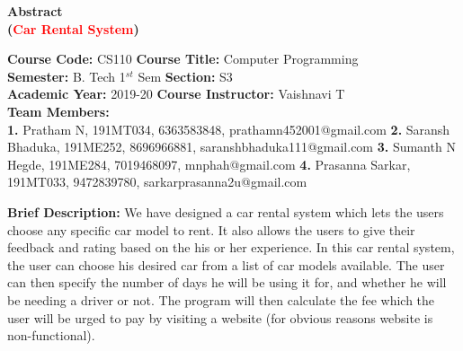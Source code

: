 \documentclass[12pt]{article}
\begin{document}


\begin{center}
    \textbf{\Large{Abstract \\
    (\textcolor{red}{Car Rental System})}}
\end{center}

\noindent 
\textbf{Course Code:} CS110 
\hspace{2in} 
\textbf{Course Title:} Computer Programming \\
\textbf{Semester:} B. Tech 1$^{st}$ Sem 
\hspace{1.6in} 
\textbf{Section:} S3 \\
\textbf{Academic Year:} 2019-20 
\hspace{1.8in} 
\textbf{Course Instructor:} Vaishnavi T \\
\textbf{Team Members:} \\
\textbf{1.} Pratham N, 191MT034, 6363583848, prathamn452001@gmail.com 
\newline
\textbf{2.} Saransh Bhaduka, 191ME252, 8696966881, saranshbhaduka111@gmail.com
\newline
\textbf{3.} Sumanth N Hegde, 191ME284, 7019468097, mnphah@gmail.com
\newline
\textbf{4.} Prasanna Sarkar, 191MT033, 9472839780, sarkarprasanna2u@gmail.com

\vspace{0.25in}

\noindent
\textbf{Brief Description:}
\newline
We have designed a car rental system which lets the users choose any specific car model to rent. It also allows the users to give their feedback and rating based on the his or her experience. 
\newline
\newline
In this car rental system, the user can choose his desired car from a list of car models available. The user can then specify the number of days he will be using it for, and whether he will be needing a driver or not. The program will then calculate the fee which the user will be urged to pay by visiting a website (for obvious reasons website is non-functional). 
\end{document}
